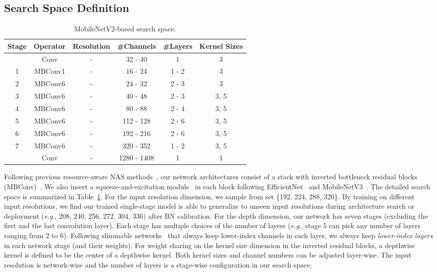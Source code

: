 \documentclass[runningheads]{llncs}
\def\onedot{.}
\def\eg{\emph{e.g}\onedot} \def\Eg{\emph{E.g}\onedot}
\begin{document}
\subsection{Search Space Definition}
\begin{table}[ht]
\small
\centering
\caption{MobileNetV2-based search space.}
\begin{tabular}{@{}c c c c c c@{}} \toprule
Stage & Operator & Resolution & \#Channels & \#Layers & Kernel Sizes\\
\midrule
 & Conv &  -  & 32 - 40 & 1 & 3\\
\cmidrule{1-6}
 1 & MBConv1 &  -  & 16 - 24 & 1 - 2 & 3\\
 \cmidrule{1-6}
 2 & MBConv6 &  -  & 24 - 32 & 2 - 3 & 3\\
 \cmidrule{1-6}
 3 & MBConv6 &  -  & 40 - 48 & 2 - 3 & 3, 5\\
 \cmidrule{1-6}
 4 & MBConv6 &  -  & 80 - 88 & 2 - 4 & 3, 5\\
 \cmidrule{1-6}
 5 & MBConv6 &  -  & 112 - 128 & 2 - 6 & 3, 5\\
 \cmidrule{1-6}
 6 & MBConv6 &  -  & 192 - 216 & 2 - 6 & 3, 5\\
 \cmidrule{1-6}
 7 & MBConv6 &  -  & 320 - 352 & 1 - 2 & 3, 5\\
 \cmidrule{1-6}
  &  Conv &  -  & 1280 - 1408 & 1 & 1 \\
\bottomrule
\end{tabular}
\label{tabs:search_space}
\end{table} 
Following previous resource-aware NAS methods~\cite{tan2018mnasnet, tan2019efficientnet, cai2018proxylessnas, wu2019fbnet, howard2019searching}, our network architectures consist of a stack with inverted bottleneck residual blocks (MBConv)~\cite{sandler2018inverted}. We also insert a squeeze-and-excitation module~\cite{hu2018squeeze} in each block following EfficientNet~\cite{tan2019efficientnet} and MobileNetV3~\cite{howard2019searching}. The detailed search space is summarized in Table~\ref{tabs:search_space}. For the input resolution dimension, we sample from set \{192, 224, 288, 320\}. By training on different input resolutions, we find our trained single-stage model is able to generalize to unseen input resolutions during architecture search or deployment (\eg, 208, 240, 256, 272, 304, 336) after BN calibration. For the depth dimension, our network has seven stages (excluding the first and the last convolution layer). Each stage has multiple choices of the number of layers (\eg, stage 5 can pick any number of layers ranging from 2 to 6). Following slimmable networks~\cite{yu2018slimmable} that always keep lower-index channels in each layer, we always keep \textit{lower-index layers} in each network stage (and their weights). For weight sharing on the kernel size dimension in the inverted residual blocks, a  depthwise kernel is defined to be the center of a  depthwise kernel. Both kernel sizes and channel numbers can be adjusted layer-wise. The input resolution is network-wise and the number of layers is a stage-wise configuration in our search space.
\end{document}
